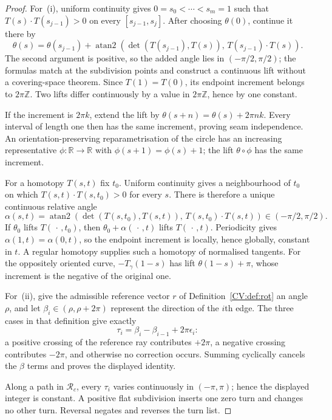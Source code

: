 \begin{proof}\leanok{}
For~(i), uniform continuity gives
$0=s_0<\cdots<s_m=1$ such that
$T(s)\cdot T(s_{j-1})>0$ on every
$[s_{j-1},s_j]$. After choosing $\theta(0)$, continue it there by
\[
 \theta(s)=\theta(s_{j-1})+
 \operatorname{atan2}\!\left(
   \det(T(s_{j-1}),T(s)),\,
   T(s_{j-1})\cdot T(s)\right).
\]
The second argument is positive, so the added angle lies in
$(-\pi/2,\pi/2)$; the formulas match at the subdivision points and construct a
continuous lift without a covering-space theorem. Since $T(1)=T(0)$, its
endpoint increment belongs to $2\pi\mathbb Z$. Two lifts differ continuously
by a value in $2\pi\mathbb Z$, hence by one constant.

If the increment is $2\pi k$, extend the lift by
$\theta(s+n)=\theta(s)+2\pi nk$. Every interval of length one then has the same
increment, proving seam independence. An orientation-preserving
reparametrisation of the circle has an increasing representative
$\phi\colon\mathbb R\to\mathbb R$ with
$\phi(s+1)=\phi(s)+1$; the lift $\theta\circ\phi$ has the same increment.

For a homotopy $T(s,t)$ fix $t_0$. Uniform continuity gives a neighbourhood of
$t_0$ on which
$T(s,t)\cdot T(s,t_0)>0$ for every $s$. There is therefore
a unique continuous relative angle
\[
 \alpha(s,t)=\operatorname{atan2}\!\left(
 \det(T(s,t_0),T(s,t)),\,
 T(s,t_0)\cdot T(s,t)\right)
 \in(-\pi/2,\pi/2).
\]
If $\theta_0$ lifts $T(\,\cdot\,,t_0)$, then
$\theta_0+\alpha(\,\cdot\,,t)$ lifts $T(\,\cdot\,,t)$.
Periodicity gives $\alpha(1,t)=\alpha(0,t)$, so the endpoint increment is
locally, hence globally, constant in $t$. A regular homotopy supplies such a
homotopy of normalised tangents. For the oppositely oriented curve,
$-T_\gamma(1-s)$ has lift $\theta(1-s)+\pi$, whose increment is the negative
of the original one.

For~(ii), give the admissible reference vector $r$ of
Definition~\ref{CV:def:rot} an angle $\rho$, and let
$\beta_i\in(\rho,\rho+2\pi)$ represent the direction of the $i$th edge.
The three cases in that definition give exactly
\[
   \tau_i=\beta_i-\beta_{i-1}+2\pi\epsilon_i:
\]
a positive crossing of the reference ray contributes $+2\pi$, a negative
crossing contributes $-2\pi$, and otherwise no correction occurs.
Summing cyclically cancels the $\beta$ terms and proves the displayed identity.

Along a path in $\mathcal R_c$, every $\tau_i$ varies continuously in
$(-\pi,\pi)$; hence the displayed integer is constant. A positive flat
subdivision inserts one zero turn and changes no other turn. Reversal negates
and reverses the turn list.


\end{proof}
